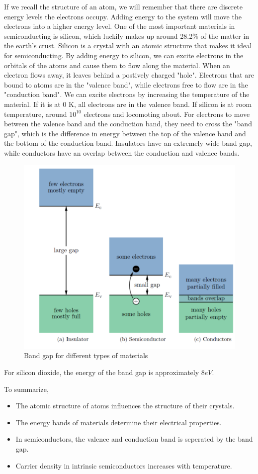 \documentclass[nobib]{tufte-handout}
\begin{document}
If we recall the structure of an atom, we will remember that 
there are discrete energy levels the electrons occupy. Adding energy to the system will 
move the electrons into a higher energy level. 
One of the most important materials in semiconducting is silicon, 
which luckily makes up around 28.2\% of the matter in the earth's crust. 
Silicon is a crystal with an atomic structure that makes it ideal 
for semiconducting. By adding energy to silicon, we can excite 
electrons in the orbitals of the atoms and cause them to flow along 
the material. When an electron flows away, it leaves behind a postively 
charged "hole". Electrons that are bound to atoms are in the "valence band",
while electrons free to flow are in the "conduction band". 
We can excite electrons by increasing the temperature 
of the material. If it is at 0 K, all electrons are 
in the valence band. If silicon is at room temperature, 
around $10^10$ electrons and locomoting about. 
For electrons to move between the valence
band and the conduction band, they need to cross the "band gap", 
which is the difference in energy between the top of the 
valence band and the bottom of the conduction band. Insulators have an 
extremely wide band gap, while conductors have an overlap 
between the conduction and valence bands. 
\begin{figure}
    \center
    \caption{Band gap for different types of materials}
    \includegraphics{images/bandgap}
\end{figure}
For silicon dioxide, the energy of the band gap is approximately 
$8 eV$. 

To summarize, 
\begin{itemize}
    \item The atomic structure of atoms influences the structure of their crystals. 
    \item The energy bands of materials determine their electrical properties. 
    \item In semiconductors, the valence and conduction band is seperated by the band gap. 
    \item Carrier density in intrinsic semiconductors increases with temperature. 
\end{itemize}
\end{document}
